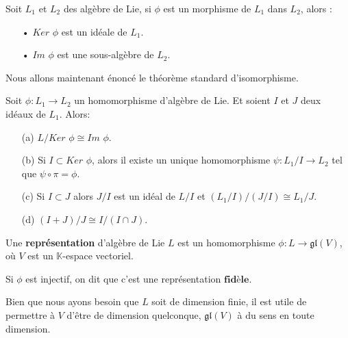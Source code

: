 \documentclass[a4paper,openany,12pt]{report}
\newcommand{\KK}{\mathbb{K}}
\newcommand{\gl}{\mathfrak{gl}}
\theoremstyle{break}
{\theorembodyfont{\upshape}
\newtheorem*{rmq}{Remarque :}
\newtheorem*{prv}{Preuve :}
\newtheorem*{ex}{Exemples :}
\newtheorem*{exe}{Exemple : }
\newtheorem*{nota}{Notation :}
\newtheorem*{dem}{D\'emonstration :}}
\begin{document}
\begin{rmq}
\quad Soit $L_{1}$ et $L_{2}$ des algèbre de Lie, si $\phi$ est un morphisme de $L_{1}$ dans $L_{2}$, alors :
\begin{itemize}
\item[•] $Ker$ $\phi$ est un idéale de $L_{1}$.
\item[•] $Im$ $\phi$ est une sous-algèbre de $L_{2}$.
\end{itemize}
\end{rmq}

\quad Nous allons maintenant énoncé le théorème standard d'isomorphisme.

\begin{thm}\label{thm:iso}
Soit $\phi: L_{1}  \to L_{2} $ un homomorphisme d'algèbre de Lie. Et soient $I$ et $J$ deux idéaux de $L_{1}$.
Alors: 
\begin{itemize}
\item[(a)] $L / Ker$ $\phi \cong Im$ $\phi$.
\item[(b)] Si $I \subset Ker$ $\phi$, alors il existe un unique homomorphisme $\psi: L_{1} / I \to L_{2} $ tel que $\psi \circ \pi= \phi$.
\item[(c)] Si $I \subset J$ alors $J / I$ est un idéal de $L/ I$ et $(L_{1} / I) /(J / I)\cong L_{1} / J$.
\item[(d)] $(I+J) / J \cong I /(I \cap J)$.
\end{itemize}
\end{thm}

\begin{df}
\quad  Une \textbf{représentation} d’algèbre de Lie $L$ est un homomorphisme $\phi: L \rightarrow \gl(V)$, où $V$ est un $\KK$-espace vectoriel.

Si $\phi$ est injectif, on dit que c'est une représentation  $\textbf{fidèle}$.
\end{df}

\quad Bien que nous ayons besoin que $L$ soit de dimension finie, il est utile de permettre à $V$ d'être de dimension quelconque, $\gl(V)$ à du sens en toute dimension.
\end{document}
